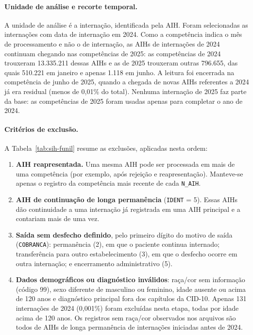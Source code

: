 \paragraph{Unidade de análise e recorte temporal.}
A unidade de análise é a internação, identificada pela AIH. Foram selecionadas
as internações com data de internação em 2024. Como a competência indica o mês
de processamento e não o de internação, as AIHs de internações de 2024
continuam chegando nas competências de 2025: as competências de 2024 trouxeram
13.335.211 dessas AIHs e as de 2025 trouxeram outras 796.655, das quais 510.221
em janeiro e apenas 1.118 em junho. A leitura foi encerrada na competência de
junho de 2025, quando a chegada de novas AIHs referentes a 2024 já era
residual (menos de 0,01\% do total). Nenhuma internação de 2025 faz parte da
base: as competências de 2025 foram usadas apenas para completar o ano de 2024.

\paragraph{Critérios de exclusão.}
A Tabela~\ref{tab:sih-funil} resume as exclusões, aplicadas nesta ordem:
\begin{enumerate}
  \item \textbf{AIH reapresentada.} Uma mesma AIH pode ser processada em mais de
    uma competência (por exemplo, após rejeição e reapresentação). Manteve-se
    apenas o registro da competência mais recente de cada \texttt{N\_AIH}.
  \item \textbf{AIH de continuação de longa permanência} (\texttt{IDENT} = 5).
    Essas AIHs dão continuidade a uma internação já registrada em uma AIH
    principal e a contariam mais de uma vez.
  \item \textbf{Saída sem desfecho definido}, pelo primeiro dígito do motivo de
    saída (\texttt{COBRANCA}): permanência (2), em que o paciente continua
    internado; transferência para outro estabelecimento (3), em que o desfecho
    ocorre em outra internação; e encerramento administrativo (5).
  \item \textbf{Dados demográficos ou diagnóstico inválidos}: raça/cor sem
    informação (código 99), sexo diferente de masculino ou feminino, idade
    ausente ou acima de 120 anos e diagnóstico principal fora dos capítulos da
    CID-10. Apenas 131 internações de 2024 (0,001\%) foram excluídas nesta
    etapa, todas por idade acima de 120 anos. Os
    registros sem raça/cor observados nos arquivos são todos de AIHs de longa
    permanência de internações iniciadas antes de 2024.
\end{enumerate}

